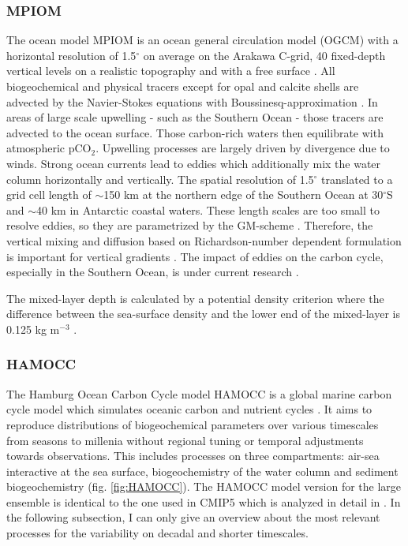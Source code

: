\documentclass[12pt]{article}
\begin{document}
\subsubsection{MPIOM}
\label{sec:mpiom}
The ocean model MPIOM is an ocean general circulation model (OGCM) with a horizontal resolution of 1.5$^\circ$ on average on the Arakawa C-grid, 40 fixed-depth vertical levels on a realistic topography and with a free surface \citep{Jungclaus2013}. All biogeochemical and physical tracers except for opal and calcite shells are advected by the Navier-Stokes equations with Boussinesq-approximation \citep{Marsland2003}. In areas of large scale upwelling - such as the Southern Ocean - those tracers are advected to the ocean surface. Those carbon-rich waters then equilibrate with atmospheric pCO$_2$. Upwelling processes are largely driven by divergence due to winds. Strong ocean currents lead to eddies which additionally mix the water column horizontally and vertically. The spatial resolution of 1.5$^\circ$ translated to a grid cell length of $\sim$150 km at the northern edge of the Southern Ocean at 30$^\circ$S and $\sim$40 km in Antarctic coastal waters. These length scales are too small to resolve eddies, so they are parametrized by the GM-scheme \citep{Gent1995}. Therefore, the vertical mixing and diffusion based on Richardson-number dependent formulation is important for vertical gradients \citep{Pacanowski1981}. The impact of eddies on the carbon cycle, especially in the Southern Ocean, is under current research \citep{Lauderdale2013,Dufour2013,Gnanadesikan2015}.

The mixed-layer depth is calculated by a potential density criterion where the difference between the sea-surface density and the lower end of the mixed-layer is 0.125 kg m$^{-3}$ \citep{Jungclaus2013}. 




\subsubsection{HAMOCC}
\label{sec:HAMOCC}
The Hamburg Ocean Carbon Cycle model HAMOCC is a global marine carbon cycle model which simulates oceanic carbon and nutrient cycles \citep{Maier-Reimer1984,Maier-Reimer1993,Six1996}. It aims to reproduce distributions of biogeochemical parameters over various timescales from seasons to millenia without regional tuning or temporal adjustments towards observations. This includes processes on three compartments: air-sea interactive at the sea surface, biogeochemistry of the water column and sediment biogeochemistry (fig. \ref{fig:HAMOCC}). The HAMOCC model version for the large ensemble is identical to the one used in CMIP5 which is analyzed in detail in \cite{Ilyina2013}. In the following subsection, I can only give an overview about the most relevant processes for the variability on decadal and shorter timescales.
\end{document}
